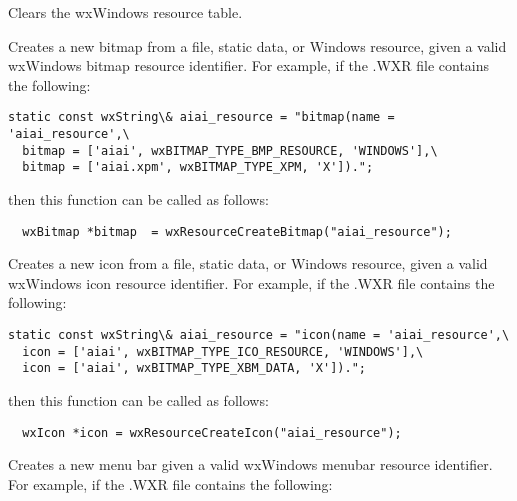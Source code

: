 

Clears the wxWindows resource table.



Creates a new bitmap from a file, static data, or Windows resource, given a valid
wxWindows bitmap resource identifier. For example, if the .WXR file contains
the following:

\begin{verbatim}
static const wxString\& aiai_resource = "bitmap(name = 'aiai_resource',\
  bitmap = ['aiai', wxBITMAP_TYPE_BMP_RESOURCE, 'WINDOWS'],\
  bitmap = ['aiai.xpm', wxBITMAP_TYPE_XPM, 'X']).";
\end{verbatim}

then this function can be called as follows:

\begin{verbatim}
  wxBitmap *bitmap  = wxResourceCreateBitmap("aiai_resource");
\end{verbatim}



Creates a new icon from a file, static data, or Windows resource, given a valid
wxWindows icon resource identifier. For example, if the .WXR file contains
the following:

\begin{verbatim}
static const wxString\& aiai_resource = "icon(name = 'aiai_resource',\
  icon = ['aiai', wxBITMAP_TYPE_ICO_RESOURCE, 'WINDOWS'],\
  icon = ['aiai', wxBITMAP_TYPE_XBM_DATA, 'X']).";
\end{verbatim}

then this function can be called as follows:

\begin{verbatim}
  wxIcon *icon = wxResourceCreateIcon("aiai_resource");
\end{verbatim}



Creates a new menu bar given a valid wxWindows menubar resource
identifier. For example, if the .WXR file contains the following:

